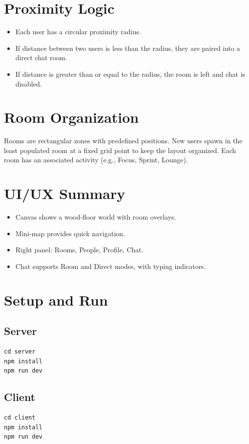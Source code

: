 \documentclass[11pt]{article}
\begin{document}
\section{Proximity Logic}
\begin{itemize}[leftmargin=*]
  \item Each user has a circular proximity radius.
  \item If distance between two users is less than the radius, they are paired into a direct chat room.
  \item If distance is greater than or equal to the radius, the room is left and chat is disabled.
\end{itemize}

\section{Room Organization}
Rooms are rectangular zones with predefined positions. New users spawn in the least populated room at a fixed grid point to keep the layout organized. Each room has an associated activity (e.g., Focus, Sprint, Lounge).

\section{UI/UX Summary}
\begin{itemize}[leftmargin=*]
  \item Canvas shows a wood-floor world with room overlays.
  \item Mini-map provides quick navigation.
  \item Right panel: Rooms, People, Profile, Chat.
  \item Chat supports Room and Direct modes, with typing indicators.
\end{itemize}

\section{Setup and Run}
\subsection{Server}
\begin{lstlisting}
cd server
npm install
npm run dev
\end{lstlisting}

\subsection{Client}
\begin{lstlisting}
cd client
npm install
npm run dev
\end{lstlisting}
\end{document}
